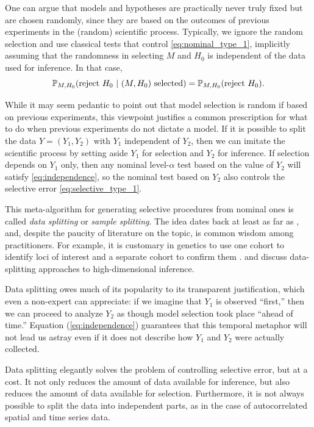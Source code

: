 \documentclass{article}
\theoremstyle{definition}
\newcommand{\capSampOrData}{Data }
\begin{document}
One can argue that models and hypotheses are practically never truly fixed but are chosen randomly, since they are based on the outcomes of previous experiments in the (random) scientific process. Typically, we ignore the random selection and use classical tests that control \eqref{eq:nominal_type_1}, implicitly assuming that the randomness in selecting $M$ and $H_0$ is independent of the data used for inference. In that case,
\begin{equation}
\P_{M, H_0}( \text{reject $H_0$} \ |\ \text{$(M, H_0)$ selected} ) = \P_{M, H_0}(\text{reject $H_0$}).
\label{eq:independence}
\end{equation}

While it may seem pedantic to point out that model selection is random if based on previous experiments, this viewpoint justifies a common prescription for what to do when previous experiments do not dictate a model. If it is possible to split the data $Y = (Y_{1}, Y_{2})$ with $Y_{1}$ independent of $Y_{2}$, then we can imitate the scientific process by setting aside $Y_{1}$ for selection and $Y_{2}$ for inference. If selection depends on $Y_{1}$ only, then any nominal level-$\alpha$ test based on the value of $Y_{2}$ will satisfy \eqref{eq:independence}, so the nominal test based on $Y_{2}$ also controls the selective error \eqref{eq:selective_type_1}.

This meta-algorithm for generating selective procedures from nominal ones is called {\em data splitting} or {\em sample splitting}. The idea dates back at least as far as \citet{cox1975note}, and, despite the paucity of literature on the topic, is common wisdom among practitioners. For example, it is customary in genetics to use one cohort to identify loci of interest and a separate cohort to confirm them \citep{sladek2007genome}. \citet{wasserman2009high} and \citet{meinshausen2009p} discuss data-splitting approaches to high-dimensional inference.

Data splitting owes much of its popularity to its transparent justification, which even a non-expert can appreciate: if we imagine that $Y_{1}$ is observed ``first,'' then we can proceed to analyze $Y_{2}$ as though model selection took place ``ahead of time.'' Equation (\ref{eq:independence}) guarantees that this temporal metaphor will not lead us astray even if it does not describe how $Y_{1}$ and $Y_{2}$ were actually collected.

\capSampOrData splitting elegantly solves the problem of controlling selective error, but at a cost. It not only reduces the amount of data available for inference, but also reduces the amount of data available for selection. Furthermore, it is not always possible to split the data into independent parts, as in the case of autocorrelated spatial and time series data.
\end{document}
